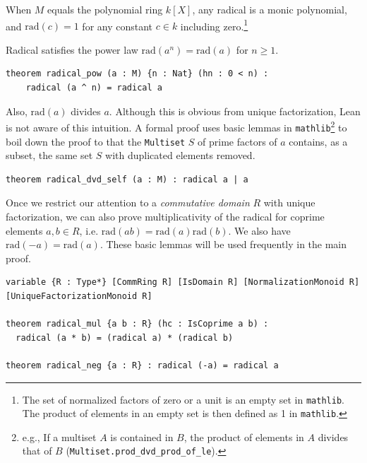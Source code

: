 \documentclass[runningheads]{llncs}
\newcommand{\rad}{\mathrm{rad}}
\begin{document}
When $M$ equals the polynomial ring $k[X]$, any radical is a monic polynomial, and $\text{rad}(c) = 1$ for any constant $c \in k$ including zero.\footnote{The set of normalized factors of zero or a unit is an empty set in \texttt{mathlib}. The product of elements in an empty set is then defined as 1 in \texttt{mathlib}.}

Radical satisfies the power law $\text{rad} (a^n) = \text{rad} (a)$ for $n \geq 1$.
\begin{verbatim}
theorem radical_pow (a : M) {n : Nat} (hn : 0 < n) :
    radical (a ^ n) = radical a
\end{verbatim}

Also, $\text{rad}(a)$ divides $a$.
Although this is obvious from unique factorization, Lean is not aware of this intuition.
A formal proof uses basic lemmas in \texttt{mathlib}\footnote{e.g., If a multiset $A$ is contained in $B$, the product of elements in $A$ divides that of $B$ (\texttt{Multiset.prod\_dvd\_prod\_of\_le}).} to boil down the proof to that the \texttt{Multiset} $S$ of prime factors of $a$ contains,
as a subset, the same set $S$ with duplicated elements removed.
\begin{verbatim}
theorem radical_dvd_self (a : M) : radical a | a
\end{verbatim}

Once we restrict our attention to a \emph{commutative domain} $R$ with unique factorization, we can also prove multiplicativity of the radical for coprime elements $a, b \in R$, i.e. $\text{rad} (ab) = \text{rad} (a) \text{rad} (b)$.
We also have $\rad (-a) = \rad(a)$. These basic lemmas will be used frequently in the main proof.

\begin{verbatim}
variable {R : Type*} [CommRing R] [IsDomain R] [NormalizationMonoid R] [UniqueFactorizationMonoid R]

theorem radical_mul {a b : R} (hc : IsCoprime a b) :
  radical (a * b) = (radical a) * (radical b)

theorem radical_neg {a : R} : radical (-a) = radical a
\end{verbatim}
\end{document}
